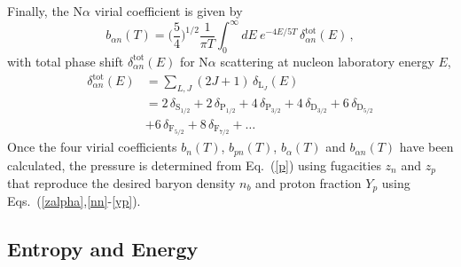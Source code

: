 \documentclass[aps,prc,twocolumn,showpacs,showkeys,amsmath,amssymb]{revtex4}
\begin{document}
Finally, the N$\alpha$ virial coefficient is given by
\begin{equation}
b_{\alpha n}(T)=\biggl(\frac{5}{4}\biggr)^{1/2} \frac{1}{\pi T} 
\int_0^\infty dE \: e^{-4E/5T} \, \delta^{\text{tot}}_{\alpha n}(E) \,,
\label{ban}
\end{equation}
with total phase shift $\delta^{\text{tot}}_{\alpha n}(E)$ for N$\alpha$ 
scattering at nucleon laboratory energy $E$,
\begin{align}
\delta^{\text{tot}}_{\alpha n}(E) &= \sum_{L,J} (2J+1) \, 
\delta_{\text{L}_J}(E)
\nonumber \\[1mm]
&=2\,\delta_{\text{S}_{1/2}}+2\,\delta_{\text{P}_{1/2}}
+4\,\delta_{\text{P}_{3/2}}+4\,\delta_{\text{D}_{3/2}}
+6\,\delta_{\text{D}_{5/2}} \nonumber \\[1mm]
&+6\,\delta_{\text{F}_{5/2}}+8\,\delta_{\text{F}_{7/2}}+ \ldots
\label{deltaantot}
\end{align}
Once the four virial coefficients $b_n(T)$, $b_{pn}(T)$, $b_\alpha(T)$ 
and $b_{\alpha n}(T)$ have been calculated, the pressure is determined 
from Eq.~(\ref{p}) using fugacities $z_n$ and $z_p$ that reproduce 
the desired baryon density $n_b$ and proton fraction $Y_p$ using 
Eqs.~(\ref{zalpha},\ref{nn}-\ref{yp}).  

\subsection{Entropy and Energy}
\end{document}
